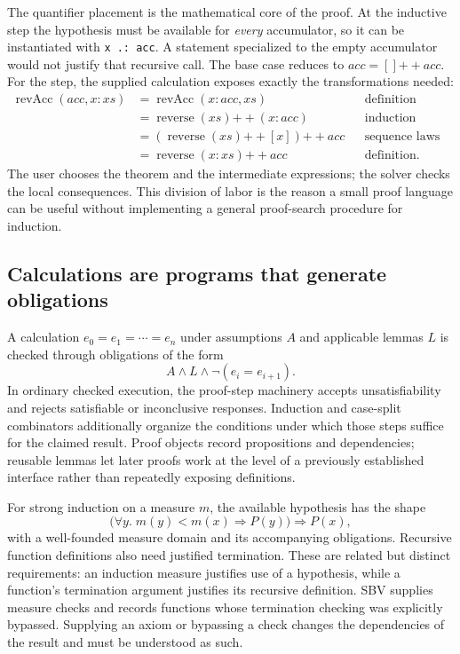 \documentclass[acmsmall,screen,nonacm]{acmart}
\newcommand{\code}[1]{\texttt{#1}}
\begin{document}
The quantifier placement is the mathematical core of the proof. At the
inductive step the hypothesis must be available for \emph{every} accumulator,
so it can be instantiated with \code{x .: acc}. A statement specialized to the
empty accumulator would not justify that recursive call. The base case reduces
to $acc=[]\mathbin{++}acc$. For the step, the supplied calculation exposes
exactly the transformations needed:
\begin{align*}
 \operatorname{revAcc}(acc,x:xs)
 &= \operatorname{revAcc}(x:acc,xs)
       &&\text{definition}\\
 &= \operatorname{reverse}(xs)\mathbin{++}(x:acc)
       &&\text{induction hypothesis}\\
 &= (\operatorname{reverse}(xs)\mathbin{++}[x])\mathbin{++}acc
       &&\text{sequence laws}\\
 &= \operatorname{reverse}(x:xs)\mathbin{++}acc
       &&\text{definition.}
\end{align*}
The user chooses the theorem and the intermediate expressions; the solver
checks the local consequences. This division of labor is the reason a small
proof language can be useful without implementing a general proof-search
procedure for induction.

\subsection{Calculations are programs that generate obligations}

A calculation $e_0=e_1=\cdots=e_n$ under assumptions $A$ and applicable lemmas
$L$ is checked through obligations of the form
\[
                A \land L \land \neg(e_i=e_{i+1}).
\]
In ordinary checked execution, the proof-step machinery accepts
unsatisfiability and rejects satisfiable or inconclusive responses. Induction
and case-split combinators additionally organize the conditions under which
those steps suffice for the claimed result. Proof objects record propositions
and dependencies; reusable lemmas let later proofs work at the level of a
previously established interface rather than repeatedly exposing definitions.

For strong induction on a measure $m$, the available hypothesis has the shape
\[
 \bigl(\forall y.\;m(y)<m(x)\Rightarrow P(y)\bigr)\Rightarrow P(x),
\]
with a well-founded measure domain and its accompanying obligations. Recursive
function definitions also need justified termination. These are related but
distinct requirements: an induction measure justifies use of a hypothesis,
while a function's termination argument justifies its recursive definition.
SBV supplies measure checks and records functions whose termination checking
was explicitly bypassed. Supplying an axiom or bypassing a check changes the
dependencies of the result and must be understood as such.
\end{document}
